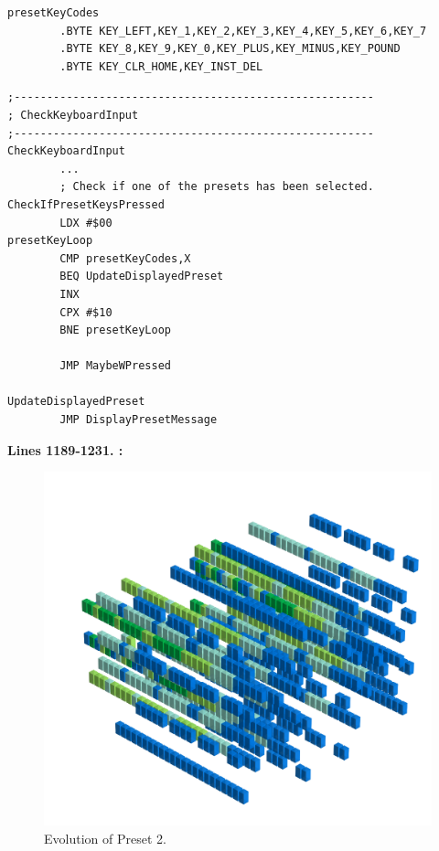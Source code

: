 \clearpage
\begin{lstlisting}
presetKeyCodes
        .BYTE KEY_LEFT,KEY_1,KEY_2,KEY_3,KEY_4,KEY_5,KEY_6,KEY_7
        .BYTE KEY_8,KEY_9,KEY_0,KEY_PLUS,KEY_MINUS,KEY_POUND
        .BYTE KEY_CLR_HOME,KEY_INST_DEL
\end{lstlisting}
\begin{lstlisting}
;-------------------------------------------------------
; CheckKeyboardInput
;-------------------------------------------------------
CheckKeyboardInput   
        ...
        ; Check if one of the presets has been selected.
CheckIfPresetKeysPressed   
        LDX #$00
presetKeyLoop   
        CMP presetKeyCodes,X
        BEQ UpdateDisplayedPreset
        INX 
        CPX #$10
        BNE presetKeyLoop

        JMP MaybeWPressed

UpdateDisplayedPreset   
        JMP DisplayPresetMessage
\end{lstlisting}

\clearpage

\textbf{Lines 1189-1231. :} 
\clearpage


\clearpage                                                                 
\begin{figure}[H]                                                          
  \centering                                                             
  \begin{adjustbox}{width=14cm,center}                                   
  \includegraphics[width=14cm]{src/presets/pattern2-45.png}%
  \end{adjustbox}                                                        
\caption{Evolution of Preset 2.}                                           
\end{figure}                                                               
\clearpage                                                                 
                                                                           

